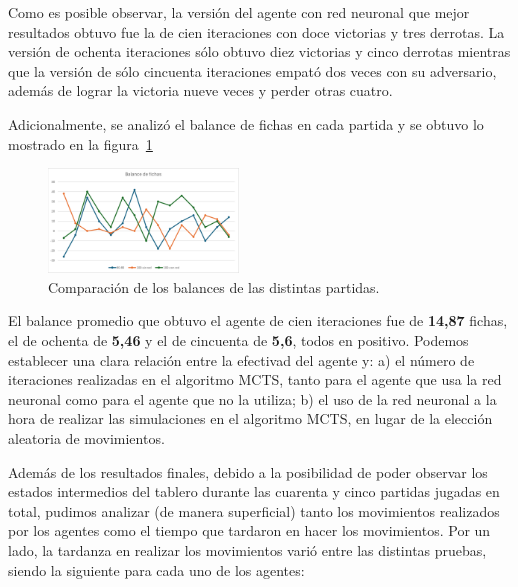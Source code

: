 \documentclass[conference]{IEEEtran}
\begin{document}
Como es posible observar, la versión del agente con red neuronal que mejor resultados obtuvo fue la de cien iteraciones con doce victorias y tres derrotas. La versión de ochenta iteraciones sólo obtuvo diez victorias y cinco derrotas mientras que la versión de sólo cincuenta iteraciones empató dos veces con su adversario, además de lograr la victoria nueve veces y perder otras cuatro.

Adicionalmente, se analizó el balance de fichas en cada partida y se obtuvo lo mostrado en la figura~\ref{fig:balances}

\begin{figure}[htbp]
    \centering
    \includegraphics[width=0.45\textwidth]{grafico_balances.png}
    \caption{Comparación de los balances de las distintas partidas.}
    \label{fig:balances}
\end{figure}

El balance promedio que obtuvo el agente de cien iteraciones fue de \textbf{14,87} fichas, el de ochenta de \textbf{5,46} y el de cincuenta de \textbf{5,6}, todos en positivo. Podemos establecer una clara relación entre la efectivad del agente y: a) el número de iteraciones realizadas en el algoritmo MCTS, tanto para el agente que usa la red neuronal como para el agente que no la utiliza; b) el uso de la red neuronal a la hora de realizar las simulaciones en el algoritmo MCTS, en lugar de la elección aleatoria de movimientos.

Además de los resultados finales, debido a la posibilidad de poder observar los estados intermedios del tablero durante las cuarenta y cinco partidas jugadas en total, pudimos analizar (de manera superficial) tanto los movimientos realizados por los agentes como el tiempo que tardaron en hacer los movimientos. Por un lado, la tardanza en realizar los movimientos varió entre las distintas pruebas, siendo la siguiente para cada uno de los agentes:
\end{document}
